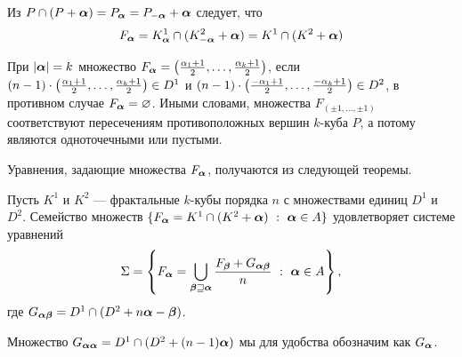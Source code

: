 Из $P\cap (P+{\bm{\alpha}})=P_{\bm{\alpha}}=P_{-{\bm{\alpha}}}+{\bm{\alpha}}$ следует, что 
\begin{equation}\label{eq:fbma}
F_{{\bm{\alpha}}}=K^1_{\bm{\alpha}}\cap(K^2_{-{\bm{\alpha}}}+{\bm{\alpha}})=K^1\cap(K^2+{\bm{\alpha}})
\end{equation}

При $|{\bm{\alpha}}|=k$ множество $F_{{\bm{\alpha}}}=\left(\frac{\alpha_1+1}{2},\ldots,\frac{\alpha_k+1}{2}\right)$, если $(n-1)\cdot\left(\frac{\alpha_1+1}{2},\ldots,\frac{\alpha_k+1}{2}\right)\in D^1$ и $(n-1)\cdot\left(\frac{-\alpha_1+1}{2},\ldots,\frac{-\alpha_k+1}{2}\right)\in D^2$, в противном случае $F_{{\bm{\alpha}}}=\varnothing$. 
Иными словами, множества $F_{(\pm1,\ldots,\pm1)}$ соответствуют пересечениям противоположных вершин $k$-куба $P$, а потому являются одноточечными или пустыми.

Уравнения, задающие множества $F_{\bm{\alpha}}$, получаются из следующей теоремы.

\begin{theorem}\label{IFC}
Пусть $K^1$ и $K^2$ --- фрактальные $k$-кубы порядка $n$ с множествами единиц $D^1$ и $D^2$.
Семейство множеств $\{F_{\bm{\alpha}}=K^1\cap(K^2+{\bm{\alpha}})\ :\ {\bm{\alpha}}\in A\}$ удовлетворяет системе уравнений
\begin{equation}\label{sideint}
\Sigma=\left\{
F_{\bm{\alpha}}=\bigcup\limits_{{\bm{\beta}}\sqsupseteq{\bm{\alpha}}} \dfrac{F_{\bm{\beta}}+G_{{\bm{\alpha}}{\bm{\beta}}}}{n}\ :\ {\bm{\alpha}}\in A\right\},
\end{equation}
где $G_{{\bm{\alpha}}{\bm{\beta}}}=D^1\cap(D^2+n{\bm{\alpha}}-{\bm{\beta}})$.
\end{theorem}

Множество $G_{{\bm{\alpha}}{\bm{\alpha}}}=D^1\cap(D^2+(n-1){\bm{\alpha}})$ мы для удобства обозначим как $G_{{\bm{\alpha}}}$.

